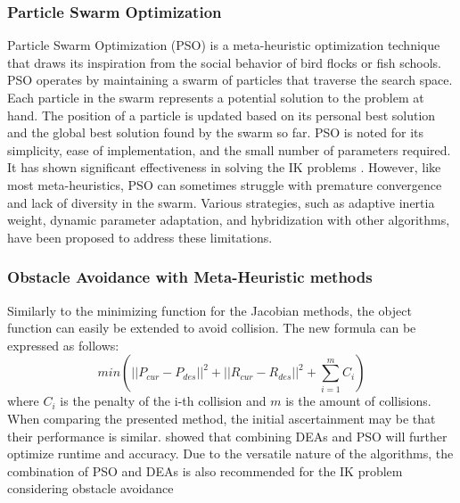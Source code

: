\documentclass[conference]{IEEEtran}
\begin{document}
\subsubsection{Particle Swarm Optimization}
Particle Swarm Optimization (PSO)\cite{wang_particle_2018} is a meta-heuristic optimization technique that draws its inspiration from the social behavior of bird flocks or fish schools. PSO operates by maintaining a swarm of particles that traverse the search space. Each particle in the swarm represents a potential solution to the problem at hand. The position of a particle is updated based on its personal best solution and the global best solution found by the swarm so far. 
PSO is noted for its simplicity, ease of implementation, and the small number of parameters required. It has shown significant effectiveness in solving the IK problems \cite{yiyang_general_2021}\cite{Deng2021}. However, like most meta-heuristics, PSO can sometimes struggle with premature convergence and lack of diversity in the swarm. Various strategies, such as adaptive inertia weight, dynamic parameter adaptation, and hybridization with other algorithms, have been proposed to address these limitations\cite{yiyang_general_2021}.

\subsubsection{Obstacle Avoidance with Meta-Heuristic methods}
Similarly to the minimizing function for the Jacobian methods, the object function can easily be extended to avoid collision. The new formula can be expressed as follows:
\begin{equation}
min\left( ||P_{cur} - P_{des}||^2 + ||R_{cur}-R_{des}||^2 + \sum_{i=1}^m C_i\right)
\end{equation}
where $C_i$ is the penalty of the i-th collision and $m$ is the amount of collisions. When comparing the presented method, the initial ascertainment may be that their performance is similar. \cite{kacprzyk_particle_2008} showed that combining DEAs and PSO will further optimize runtime and accuracy. Due to the versatile nature of the algorithms, the combination of PSO and DEAs\cite{starke_efficient_2016} is also recommended for the IK problem considering obstacle avoidance
\end{document}
